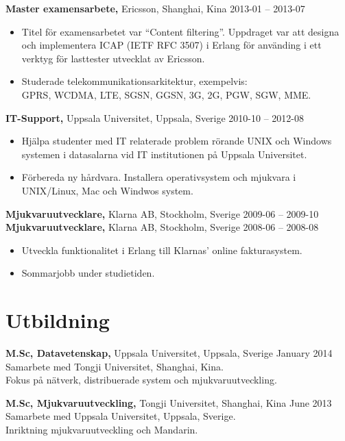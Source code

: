 \documentclass[margin]{res}
\begin{document}
\begin{resume}
{\bf Master examensarbete,} Ericsson, Shanghai, Kina \hfill 2013-01 -- 2013-07
 \begin{itemize} \itemsep -2pt  %
 \item Titel för examensarbetet var ``Content filtering''. Uppdraget var
   att designa och implementera ICAP (IETF RFC 3507) i Erlang för
   använding i ett verktyg för lasttester utvecklat av Ericsson.
 \item Studerade telekommunikationsarkitektur, exempelvis: \\
 GPRS, WCDMA, LTE, SGSN, GGSN, 3G, 2G, PGW, SGW, MME.
 \end{itemize}

{\bf IT-Support,} Uppsala Universitet, Uppsala, Sverige \hfill 2010-10 -- 2012-08
 \begin{itemize} \itemsep -2pt  %
 \item Hjälpa studenter med IT relaterade problem rörande UNIX och
   Windows systemen i datasalarna vid IT institutionen på Uppsala Universitet.
 \item Förbereda ny hårdvara. Installera operativsystem och mjukvara i UNIX/Linux, Mac och Windwos system.
 \end{itemize}

{\bf Mjukvaruutvecklare,} Klarna AB, Stockholm, Sverige \hfill 2009-06 -- 2009-10\\
{\bf Mjukvaruutvecklare,} Klarna AB, Stockholm, Sverige \hfill 2008-06 -- 2008-08
\begin{itemize} \itemsep -2pt  %
\item Utveckla funktionalitet i Erlang till Klarnas' online fakturasystem.
\item Sommarjobb under studietiden.
\end{itemize}

\section{Utbildning}
{\bf M.Sc,  Datavetenskap,} Uppsala Universitet, Uppsala, Sverige \hfill January 2014 \\
Samarbete med Tongji Universitet, Shanghai, Kina. \\
Fokus på nätverk, distribuerade system och mjukvaruutveckling.

{\bf M.Sc, Mjukvaruutveckling,} Tongji Universitet, Shanghai, Kina \hfill June 2013 \\
Samarbete med Uppsala Universitet, Uppsala, Sverige. \\
Inriktning mjukvaruutveckling och Mandarin.


\end{resume}
\end{document}
